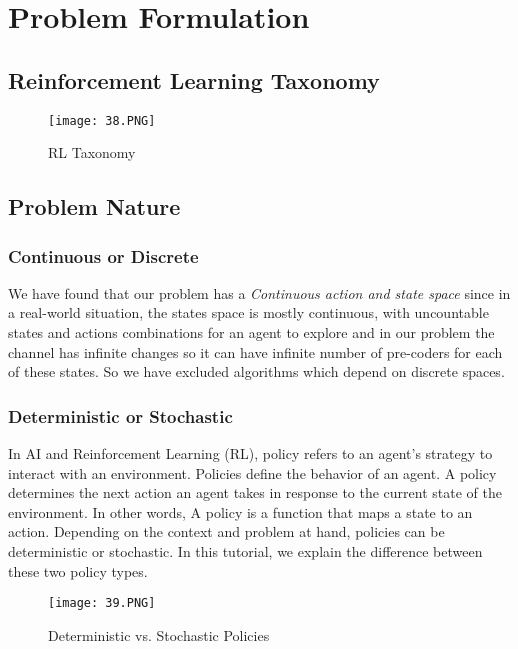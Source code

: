 \section{Problem Formulation}
\subsection{Reinforcement Learning Taxonomy}
\begin{figure}[ht]
    \centering
    \texttt{[image: 38.PNG]}
    \caption{RL Taxonomy}
    \label{fig:RL Taxonomy}
\end{figure}

\subsection{Problem Nature}
\subsubsection{Continuous or Discrete}
We have found that our problem has a \emph{Continuous action and state space} since in a real-world situation, the states space is mostly continuous, with uncountable states and actions combinations for an agent to explore and in our problem the channel has infinite changes so it can have infinite number of pre-coders for each of these states.
So we have excluded algorithms which depend on discrete spaces.

\subsubsection{Deterministic or Stochastic}
In AI and Reinforcement Learning (RL), policy refers to an agent's strategy to interact with an environment. Policies define the behavior of an agent. A policy determines the next action an agent takes in response to the current state of the environment. 
In other words, A policy is a function that maps a state to an action. Depending on the context and problem at hand, policies can be deterministic or stochastic. In this tutorial, we explain the difference between these two policy types.
\begin{figure}[ht]
    \centering
    \texttt{[image: 39.PNG]}
    \caption{Deterministic vs. Stochastic Policies}
    \label{fig:Deterministic vs. Stochastic Policies}
\end{figure}

